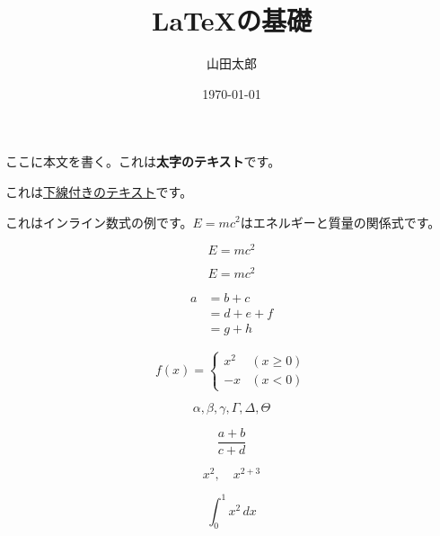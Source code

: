 \documentclass{article}
\title{LaTeXの基礎}
\author{山田太郎}
\date{\today}
\begin{document}
\maketitle

ここに本文を書く。これは\textbf{太字のテキスト}です。

これは\underline{下線付きのテキスト}です。

これはインライン数式の例です。$E=mc^2$はエネルギーと質量の関係式です。

\[
  E=mc^2
\]

\begin{equation}
  E=mc^2
\end{equation}

\begin{align}
  a & =b+c   \\
    & =d+e+f \\
    & =g+h
\end{align}

\begin{equation}
  f(x) =
  \begin{cases}
    x^2 & (x \geq 0) \\
    -x  & (x < 0)
  \end{cases}
\end{equation}

\[
  \alpha, \beta, \gamma, \Gamma, \Delta, \Theta
\]

\[
  \frac{a+b}{c+d}
\]

\[
  x^2,\quad x^{2+3}
\]

\[
  \int_{0}^{1}x^2\,dx
\]
\end{document}
